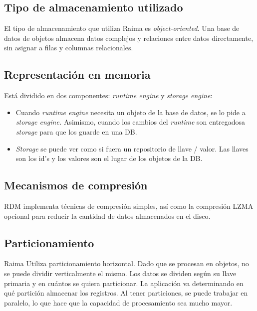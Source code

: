 \documentclass{acmart}
\begin{document}
\subsection{Tipo de almacenamiento utilizado}
El tipo de almacenamiento que utiliza Raima es \textit{object-oriented}. Una base de datos de objetos almacena datos complejos y relaciones entre datos directamente, sin asignar a filas y columnas relacionales. \cite{Rpdf1, Rarch}

\subsection{Representación en memoria}
Está dividido en dos componentes: \textit{runtime engine} y \textit{storage engine}:
\begin{itemize}
	\item Cuando \textit{runtime engine }necesita un objeto de la base de datos, se lo pide a \textit{storage engine. }Asimismo, cuando los cambios del \textit{runtime }son entregadosa \textit{storage }para que los guarde en una DB. \cite{Rinmemory}

	\item \textit{Storage }se puede ver como si fuera un repositorio de llave / valor. Las llaves son los id’s y los valores son el lugar de los objetos de la DB. \cite{Rinmemory}
\end{itemize}
\subsection{Mecanismos de compresión}
RDM implementa técnicas de compresión simples, así como la compresión LZMA opcional para reducir la cantidad de datos almacenados en el disco. \cite{Rover}
\subsection{Particionamiento}
Raima Utiliza particionamiento horizontal. Dado que se procesan en objetos, no se puede dividir verticalmente el mismo. Los datos se dividen según su llave primaria y en cuántos se quiera particionar. La aplicación va determinando en qué partición almacenar los registros. Al tener particiones, se puede trabajar en paralelo, lo que hace que la capacidad de procesamiento sea mucho mayor.
\end{document}
